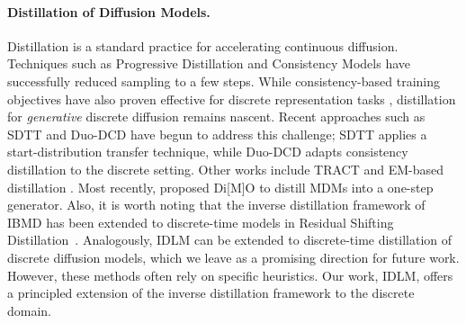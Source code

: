 \paragraph{Distillation of Diffusion Models.}
Distillation is a standard practice for accelerating continuous diffusion. Techniques such as Progressive Distillation \citep{salimans2022progressive} and Consistency Models
\citep{song2023consistency, kim2023consistency} have successfully reduced sampling to a few steps.
While consistency-based training objectives have also proven effective for discrete representation tasks \citep{consistency2024rep},
distillation for \textit{generative} discrete diffusion remains nascent.
Recent approaches such as SDTT \citep{deschenaux2024beyond} and Duo-DCD \citep{sahoo2025the} have begun to address this challenge;
SDTT applies a start-distribution transfer technique, while Duo-DCD adapts consistency distillation to the discrete setting.
Other works include TRACT \citep{berthelot2023tract} and EM-based distillation \citep{xie2024distillation}.
Most recently, \citet{zhu_dimathttmo_2025} proposed Di[M]O to distill MDMs into a one-step generator.
Also, it is worth noting that the inverse distillation framework of IBMD \citep{gushchin2025inverse} has been extended
to discrete-time models in Residual Shifting Distillation~\citep[RSD]{selikhanovych2025one}.
Analogously, IDLM can be extended to discrete-time distillation of discrete diffusion models,
which we leave as a promising direction for future work. However, these methods often rely on specific heuristics.
Our work, IDLM, offers a principled extension of the inverse distillation framework
\citep{gushchin2025inverse, kornilov2025universal} to the discrete domain.
